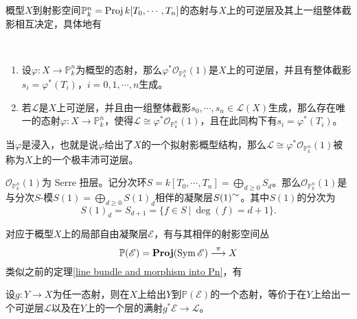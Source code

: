 概型$X$到射影空间$\mathbb{P}_k^n = \operatorname{Proj} k[T_0,\cdots,T_n]$的态射与$X$上的可逆层及其上一组整体截影相互决定，具体地有
\begin{theorem}
\label{line bundle and morphism into Pn}
\ 
\begin{enumerate}
\item 设$\varphi: X \rightarrow \mathbb{P}_k^n$为概型的态射，那么$\varphi^*\mathcal{O}_{\mathbb{P}_k^n}(1)$是$X$上的可逆层，并且有整体截影$s_i = \varphi^*(T_i)$，$i=0,1,\cdots,n$生成。
\item 若$\mathscr{L}$是$X$上可逆层，并且由一组整体截影$s_0, \cdots, s_n\in \mathscr{L}(X)$生成，那么存在唯一的态射$\varphi: X \rightarrow \mathbb{P}_k^n$，使得$\mathscr{L}\cong \varphi^*\mathcal{O}_{\mathbb{P}_k^n}(1)$，且在此同构下有$s_i = \varphi^*(T_i)$。
\end{enumerate}
\end{theorem}

当$\varphi$是浸入，也就是说$\varphi$给出了$X$的一个拟射影概型结构，那么$\mathscr{L}\cong \varphi^*\mathcal{O}_{\mathbb{P}_k^n}(1)$被称为$X$上的一个极丰沛可逆层。

$\mathcal{O}_{\mathbb{P}_k^n}(1)$为 Serre 扭层。记分次环$S = k[T_0,\cdots,T_n] = \bigoplus\limits_{d\geqslant0}S_d$。那么$\mathcal{O}_{\mathbb{P}_k^n}(1)$是与分次$S$-模$S(1) = \bigoplus\limits_{d\geqslant0}S(1)_d$相伴的凝聚层$S(1)^{\mbox{$\sim$}}$。其中$S(1)$的分次为
\begin{equation}
S(1)_d = S_{d+1} = \{ f\in S \ |\ \deg(f) = d+1 \}.
\end{equation}

对应于概型$X$上的局部自由凝聚层$\mathscr{E}$，有与其相伴的射影空间丛
\begin{equation}
\mathbb{P}(\mathscr{E}) = \operatorname{\mathbf{Proj}}(\operatorname{Sym}\mathscr{E}) \overset{\pi}{\longrightarrow} X
\end{equation}
类似之前的定理\ref{line bundle and morphism into Pn}，有
\begin{proposition}
设$g: Y \rightarrow X$为任一态射，则在$X$上给出$Y$到$\mathbb{P}(\mathscr{E})$的一个态射，等价于在$Y$上给出一个可逆层$\mathscr{L}$以及在$Y$上的一个层的满射$g^*\mathscr{E} \rightarrow \mathscr{L}$。
\end{proposition}

